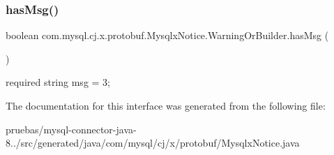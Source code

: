 \subsubsection{\texorpdfstring{has\+Msg()}{hasMsg()}}
{\footnotesize\ttfamily boolean com.\+mysql.\+cj.\+x.\+protobuf.\+Mysqlx\+Notice.\+Warning\+Or\+Builder.\+has\+Msg (\begin{DoxyParamCaption}{ }\end{DoxyParamCaption})}

{\ttfamily required string msg = 3;} 

The documentation for this interface was generated from the following file\+:\begin{DoxyCompactItemize}
\item 
pruebas/mysql-\/connector-\/java-\/8../src/generated/java/com/mysql/cj/x/protobuf/Mysqlx\+Notice.\+java\end{DoxyCompactItemize}
